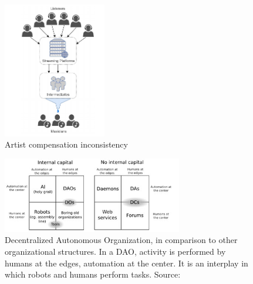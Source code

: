 \begin{figure}
	\includegraphics[width=0.4\textwidth]{introduction/problem-image.png}
	\caption{Artist compensation inconsistency}
\end{figure}
\begin{figure}
    \centering
    \includegraphics[width=0.7\textwidth]{introduction/dao-quadrants.jpg}
    \caption{Decentralized Autonomous Organization, in comparison to other organizational structures. In a DAO, activity is performed by humans at the edges, automation at the center. It is an interplay in which robots and humans perform tasks. Source: \cite{buterin2014dao}}
    \label{fig:dao-quadrants}
\end{figure}


